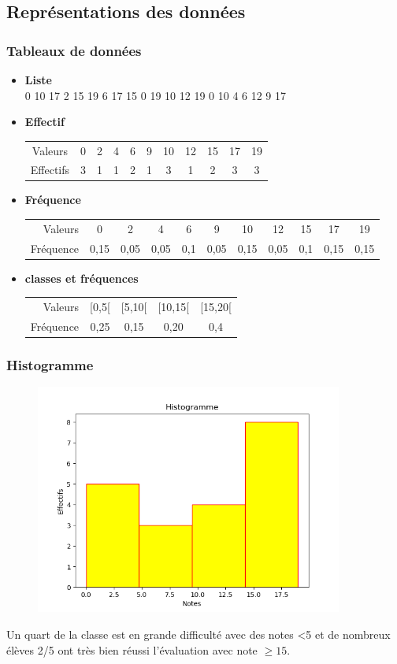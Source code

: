\documentclass[10pt, french]{beamer}
\begin{document}
\subsection{Représentations des données}
\begin{frame}
  \frametitle{Tableaux de données}
  \begin{itemize}
\item  \textbf{Liste}\\ 0 10 17 2 15 19  6 17 15 0 19 10 12 19 0 10 4 6 12 9 17 \\
\item  \textbf{Effectif}\\
\begin{tabular}{ccccccccccc}
Valeurs  & 0 &2 & 4&6&9&10&12&15&17&19\\
Effectifs &3  & 1& 1&2&1&3&1&2&3&3
\end{tabular}
\item  \textbf{Fréquence}\\
\hspace{-2cm}\begin{tabular}{rcccccccccc}
Valeurs  & 0 &2 & 4&6&9&10&12&15&17&19\\
Fréquence &0,15  & 0,05& 0,05 &0,1&0,05&0,15&0,05&0,1&0,15&0,15
\end{tabular}
\item  \textbf{classes et fréquences}\\
\begin{tabular}{rcccc}
Valeurs  & [0,5[ &[5,10[&[10,15[&[15,20[\\
Fréquence & 0,25&0,15&0,20&0,4
\end{tabular}
  \end{itemize}
\end{frame}
\begin{frame}
  \frametitle{Histogramme}
  \begin{figure}
    \includegraphics[width=0.9\textwidth]{Images/note.png}
  \end{figure}
Un quart de la classe est en grande difficulté avec des notes <5 et de nombreux élèves 2/5 ont très bien réussi l'évaluation avec note $\geq 15$.  
\end{frame}
\end{document}
